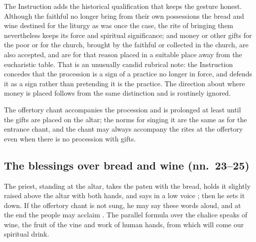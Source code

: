 The Instruction adds the historical qualification that keeps the gesture honest. Although the
faithful no longer bring from their own possessions the bread and wine destined for the liturgy
as was once the case, the rite of bringing them nevertheless keeps its force and spiritual
significance; and money or other gifts for the poor or for the church, brought by the faithful
or collected in the church, are also accepted, and are for that reason placed in a suitable
place away from the eucharistic table. That is an
unusually candid rubrical note: the Instruction concedes that the procession is a sign of a
practice no longer in force, and defends it as a sign rather than pretending it is the
practice. The direction about where money is placed follows from the same distinction and is
routinely ignored.

The offertory chant accompanies the procession and is prolonged at least until the gifts are
placed on the altar; the norms for singing it are the same as for the entrance chant, and the
chant may always accompany the rites at the offertory even when there is no procession with
gifts.

\subsection{The blessings over bread and wine (nn.\ 23--25)}

The priest, standing at the altar, takes the paten with the bread, holds it slightly raised
above the altar with both hands, and says in a low voice ; then he sets it down. If the offertory chant is
not sung, he may say these words aloud, and at the end the people may acclaim . The parallel formula over the chalice speaks of wine, the fruit of the vine
and work of human hands, from which will come our spiritual drink.

